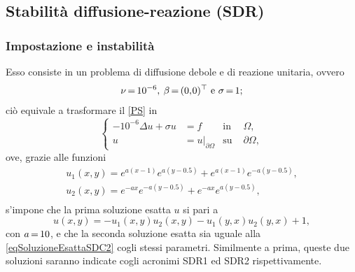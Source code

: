 \documentclass{article}
\newcommand{\SpaziaturaMate}[3]{
    \setlength{\thinmuskip}{#1mu}
    \setlength{\medmuskip}{#2mu}
    \setlength{\thickmuskip}{#3mu}
}
\newcommand{\teqref}[2]{\hyperref[#1]{#2}}
\begin{document}
    
        \subsection{Stabilità diffusione-reazione (SDR)}

            \subsubsection{Impostazione e instabilità}

                Esso consiste in un problema di diffusione debole e di reazione unitaria, ovvero
                \begin{equation*}
                    \setlength{\abovedisplayskip}{5pt plus 2pt minus 2pt}  %
                    \setlength{\belowdisplayskip}{5pt plus 2pt minus 2pt}  %
                    \SpaziaturaMate{1}{2}{3}
                    \nu=10^{-6},\;\;\beta=(0,0)^{\top}\text{ e }\sigma=1;
                \end{equation*}
                ciò equivale a trasformare il \teqref{eqProblemaStazionario}{[PS]} in
                \begin{equation}
                    \left\{
                    \begin{aligned}
                        -10^{-6}\Delta u+\sigma u&=f&\text{in }&\Omega, \\
                        u&=u\vert_{\partial\Omega}&\text{su }&\partial\Omega,
                    \end{aligned}
                    \right.
                    \label{eqSDR}
                \end{equation}
                ove, grazie alle funzioni
                \begin{equation*}
                    \begin{gathered}
                        u_1(x,y)=e^{a(x-1)}e^{a(y-0.5)}+e^{a(x-1)}e^{-a(y-0.5)},\\
                        u_2(x,y)=e^{-ax}e^{-a(y-0.5)}+e^{-ax}e^{a(y-0.5)},\\
                    \end{gathered}
                \end{equation*}
                s'impone che la prima soluzione esatta $u$ si pari a
                \begin{equation}
                    u(x,y)=-u_1(x,y)u_2(x,y)-u_1(y,x)u_2(y,x)+1,
                    \label{eqSoluzioneEsattaSDR1}
                \end{equation}
                con {$\SpaziaturaMate{1}{2}{3}a=10$}, e che la seconda soluzione esatta sia uguale alla \eqref{eqSoluzioneEsattaSDC2} cogli stessi parametri. Similmente a prima, queste due soluzioni saranno indicate cogli acronimi SDR1 ed SDR2 rispettivamente.
\end{document}
